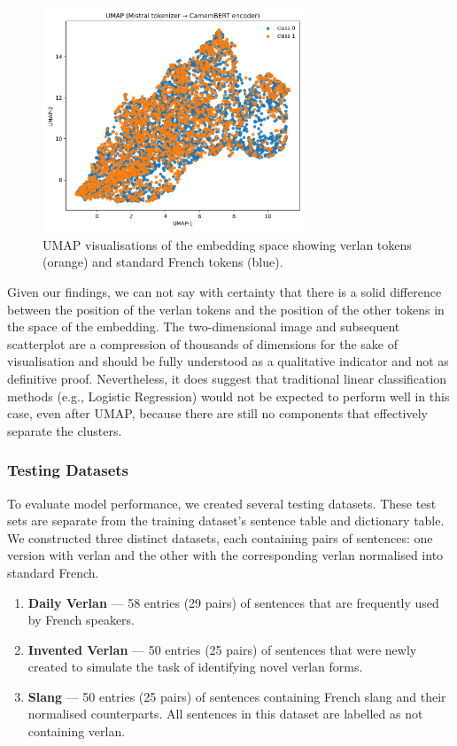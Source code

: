 \documentclass[12pt]{article}
\begin{document}
\begin{figure}[H]
    \centering
    \includegraphics[width=0.7\textwidth]{figures/mistral_bert_umap.png}
    \caption{UMAP visualisations of the embedding space showing verlan tokens (orange) and standard French tokens (blue).}
    \label{fig:umap_comparison}
\end{figure}

Given our findings, we can not say with certainty that there is a solid difference between the position of the verlan tokens and the position of the other tokens in the space of the embedding. 
The two-dimensional image and subsequent scatterplot are a compression of thousands of dimensions for the sake of visualisation and should be fully understood as a qualitative indicator and not as definitive proof. 
Nevertheless, it does suggest that traditional linear classification methods (e.g., Logistic Regression) would not be expected to perform well in this case, even after UMAP, because there are still no components that effectively separate the clusters.

\subsubsection{Testing Datasets}
To evaluate model performance, we created several testing datasets. 
These test sets are separate from the training dataset's sentence table and dictionary table. 
We constructed three distinct datasets, each containing pairs of sentences: one version with verlan and the other with the corresponding verlan normalised into standard French.

\begin{enumerate}
\item \textbf{Daily Verlan} --- 58 entries (29 pairs) of sentences that are frequently used by French speakers.
  \item \textbf{Invented Verlan} --- 50 entries (25 pairs) of sentences that were newly created to simulate the task of identifying novel verlan forms.
  \item \textbf{Slang} --- 50 entries (25 pairs) of sentences containing French slang and their normalised counterparts. All sentences in this dataset are labelled as not containing verlan.
\end{enumerate}
\end{document}

